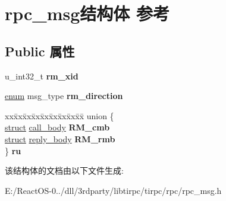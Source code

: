 \hypertarget{structrpc__msg}{}\section{rpc\+\_\+msg结构体 参考}
\label{structrpc__msg}
\subsection*{Public 属性}
\begin{DoxyCompactItemize}
\item 
\mbox{\label{structrpc__msg_ac19aaab021eefae88bce3c6d67b467f1}} 
u\+\_\+int32\+\_\+t {\bfseries rm\+\_\+xid}
\item 
\mbox{\label{structrpc__msg_a08947af43344ba9d88cf8755fe9d1f9d}} 
\hyperlink{interfaceenum}{enum} msg\+\_\+type {\bfseries rm\+\_\+direction}
\item 
\mbox{\label{structrpc__msg_a64314e394f76448f0f46462681faee89}} 
\begin{tabbing}
xx\=xx\=xx\=xx\=xx\=xx\=xx\=xx\=xx\=\kill
union \{\\
\>\hyperlink{interfacestruct}{struct} \hyperlink{structcall__body}{call\_body} {\bfseries RM\_cmb}\\
\>\hyperlink{interfacestruct}{struct} \hyperlink{structreply__body}{reply\_body} {\bfseries RM\_rmb}\\
\} {\bfseries ru}\\

\end{tabbing}\end{DoxyCompactItemize}


该结构体的文档由以下文件生成\+:\begin{DoxyCompactItemize}
\item 
E\+:/\+React\+O\+S-\/0../dll/3rdparty/libtirpc/tirpc/rpc/rpc\+\_\+msg.\+h\end{DoxyCompactItemize}
